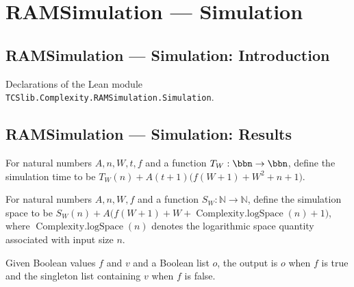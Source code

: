 \section{RAMSimulation --- Simulation}
\subsection*{RAMSimulation --- Simulation: Introduction}

Declarations of the Lean module \texttt{TCSlib.Complexity.RAMSimulation.Simulation}.

\subsection*{RAMSimulation --- Simulation: Results}

\begin{definition}
\label{WordRAM.simTime}
\leanok
For natural numbers $A,n,W,t,f$ and a function $T_W : \bbn \to \bbn$, define the
simulation time to be $T_W(n)+A(t+1)\bigl(f(W+1)+W^2+n+1\bigr)$.
\end{definition}

\begin{definition}
\label{WordRAM.simSpace}
\leanok
{}
For natural numbers $A,n,W,f$ and a function $S_W : \mathbb{N} \to \mathbb{N}$, define
the simulation space to be
$S_W(n)+A\bigl(f(W+1)+W+\operatorname{Complexity.logSpace}(n)+1\bigr)$, where
$\operatorname{Complexity.logSpace}(n)$ denotes the logarithmic space quantity
associated with input size $n$.
\end{definition}

\begin{definition}
\label{WordRAM.outputOf}
\leanok
Given Boolean values $f$ and $v$ and a Boolean list $o$, the output is $o$ when $f$ is
true and the singleton list containing $v$ when $f$ is false.
\end{definition}

